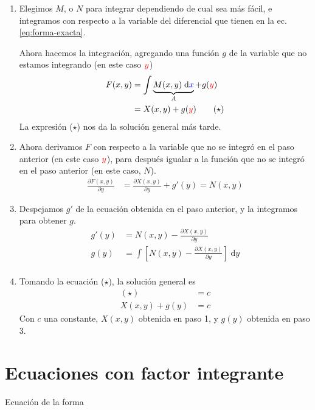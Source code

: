 \documentclass[a4paper]{article}
\newcommand{\dif}[1]{\;\mathrm{d}#1}
\begin{document}
\begin{enumerate}
    \item Elegimos $M$, o $N$ para integrar dependiendo de cual sea más fácil, e integramos con respecto a la variable del diferencial que tienen en la ec. \eqref{eq:forma-exacta}.
    
    Ahora hacemos la integración, agregando una función $g$ de la variable que no estamos integrando (en este caso ${\color{red} y}$)
    \begin{align*}
        F(x,y) &= \int \underbrace{M(x,y) \dif{{\color{blue}x}}}_{A} + g({\color{red}y}) \\
        &= X(x,y) + g({\color{red}y}) \tag{$\star$}
    \end{align*}
    La expresión ($\star$) nos da la solución general más tarde.

    \item Ahora derivamos $F$ con respecto a la variable que no se integró en el paso anterior (en este caso ${\color{red} y}$), para después igualar a la función que no se integró en el paso anterior (en este caso, $N$).
    \begin{align*}
        \frac{\partial F(x,y)}{\partial y} &= \frac{\partial X(x,y)}{\partial y} + g'(y) = N(x,y) 
    \end{align*}

    \item Despejamos $g'$ de la ecuación obtenida en el paso anterior, y la integramos para obtener $g$.
    \begin{align*}
        g'(y) &= N(x,y) - \frac{\partial X(x,y)}{\partial y} \\
        g(y) &= \int \left[ N(x,y) - \frac{\partial X(x,y)}{\partial y}  \right] \dif{y} \\
    \end{align*}

    \item 
    Tomando la ecuación ($\star$), la solución general es
    \begin{align*}
        (\star) &= c \\
        X(x,y) + g(y) &= c
    \end{align*}
    Con $c$ una constante, $X(x,y)$ obtenida en paso 1, y $g(y)$ obtenida en paso 3.
\end{enumerate}


\section{Ecuaciones con factor integrante}
Ecuación de la forma 
\end{document}
